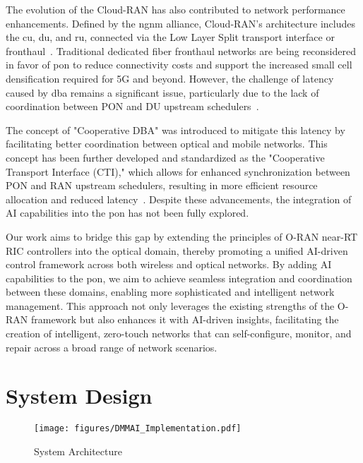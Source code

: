 The evolution of the Cloud-RAN has also contributed to network performance enhancements. Defined by the \ac{ngnm} alliance, Cloud-RAN's architecture includes the \ac{cu}, \ac{du}, and \ac{ru}, connected via the Low Layer Split transport interface or fronthaul~\cite{das2019variable}. Traditional dedicated fiber fronthaul networks are being reconsidered in favor of \ac{pon} to reduce connectivity costs and support the increased small cell densification required for 5G and beyond. However, the challenge of latency caused by \ac{dba} remains a significant issue, particularly due to the lack of coordination between PON and DU upstream schedulers~\cite{slyne2024demonstration}.

The concept of "Cooperative DBA" was introduced to mitigate this latency by facilitating better coordination between optical and mobile networks. This concept has been further developed and standardized as the "Cooperative Transport Interface (CTI)," which allows for enhanced synchronization between PON and RAN upstream schedulers, resulting in more efficient resource allocation and reduced latency~\cite{nomura2017first}. Despite these advancements, the integration of AI capabilities into the \ac{pon} has not been fully explored.

Our work aims to bridge this gap by extending the principles of O-RAN near-RT RIC controllers into the optical domain, thereby promoting a unified AI-driven control framework across both wireless and optical networks. By adding AI capabilities to the \ac{pon}, we aim to achieve seamless integration and coordination between these domains, enabling more sophisticated and intelligent network management. This approach not only leverages the existing strengths of the O-RAN framework but also enhances it with AI-driven insights, facilitating the creation of intelligent, zero-touch networks that can self-configure, monitor, and repair across a broad range of network scenarios.


\section{System Design}
\begin{figure}[tp]
\centering
\texttt{[image: figures/DMMAI\_Implementation.pdf]}
\caption{System Architecture}\label{fig:system_architecture}\vspace{-2em}
\end{figure}

